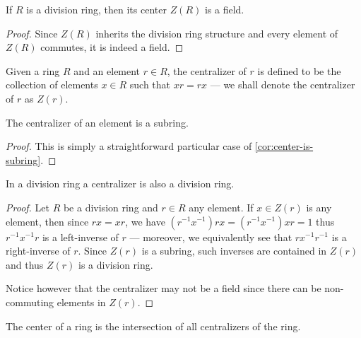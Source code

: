 %
\begin{corollary}
\label{cor:division-ring-center-is-field}
If \(R\) is a division ring, then its center \(Z(R)\) is a field.
\end{corollary}
%

%
\begin{proof}
Since \(Z(R)\) inherits the division ring structure and every element of
\(Z(R)\) commutes, it is indeed a field.
\end{proof}
%

%
\begin{definition}[Centralizer]
\label{def:ring-centralizer}
Given a ring \(R\) and an element \(r \in R\), the centralizer of \(r\) is
defined to be the collection of elements \(x \in R\) such that \(x r = r x\) ---
we shall denote the centralizer of \(r\) as \(Z(r)\).
\end{definition}
%

%
\begin{corollary}
\label{cor:centralizer-is-subring}
The centralizer of an element is a subring.
\end{corollary}
%

%
\begin{proof}
This is simply a straightforward particular case of
\cref{cor:center-is-subring}.
\end{proof}
%

%
\begin{corollary}
\label{cor:division-ring-centralizer-is-division-ring}
In a division ring a centralizer is also a division ring.
\end{corollary}
%

%
\begin{proof}
Let \(R\) be a division ring and \(r \in R\) any element. If \(x \in Z(r)\) is
any element, then since \(r x = x r\), we have \((r^{-1} x^{-1}) r x = (r^{-1}
x^{-1}) x r = 1\) thus \(r^{-1} x^{-1} r\) is a left-inverse of \(r\) ---
moreover, we equivalently see that \(r x^{-1} r^{-1}\) is a right-inverse of
\(r\). Since \(Z(r)\) is a subring, such inverses are contained in \(Z(r)\) and
thus \(Z(r)\) is a division ring.

Notice however that the centralizer may not be a field since there can be
non-commuting elements in \(Z(r)\).
\end{proof}
%

%
\begin{corollary}
\label{cor:center-is-intersection-of-all-centralizers}
The center of a ring is the intersection of all centralizers of the ring.
\end{corollary}
%


